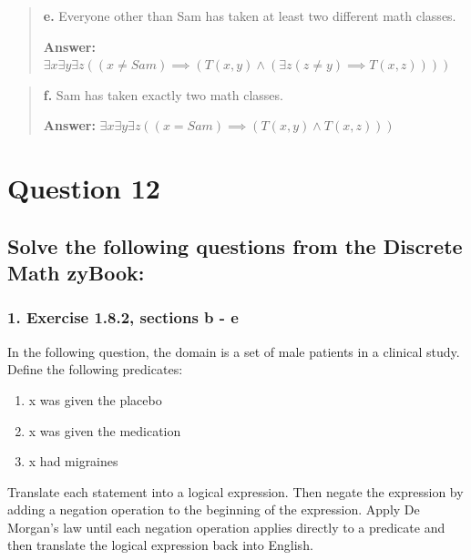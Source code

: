 \documentclass[11pt, oneside]{article}
\begin{document}
\begin{quote}
    \textbf{e. }Everyone other than Sam has taken at least two different math classes.

    \textbf{Answer:} $\exists x \exists y \exists z ((x \ne Sam) \implies (T(x, y) \land (\exists z (z \ne y) \implies T(x, z))))$
\end{quote}

\begin{quote}
    \textbf{f. }Sam has taken exactly two math classes.

    \textbf{Answer:} $\exists x \exists y \exists z ((x = Sam) \implies (T(x, y) \land T(x, z)))$
\end{quote}

\pagebreak

\section*{Question 12}

\subsection*{Solve the following questions from the Discrete Math zyBook:}

\subsubsection*{1. Exercise 1.8.2, sections b - e}

In the following question, the domain is a set of male patients in a clinical study. Define the following predicates:

\begin{enumerate}
    \item[P(x):] x was given the placebo
    \item[D(x):] x was given the medication
    \item[M(x):] x had migraines
\end{enumerate}

Translate each statement into a logical expression. Then negate the expression by adding a negation operation to the beginning of the expression. Apply De Morgan's law until each negation operation applies directly to a predicate and then translate the logical expression back into English.
\end{document}
